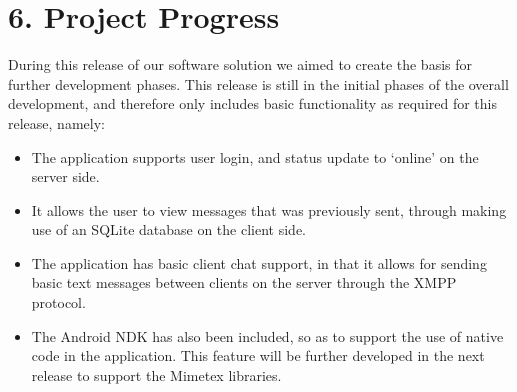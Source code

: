 \documentclass[29pt,a4paper]{moderncv}
\begin{document}
\newpage
		\section*{6. Project Progress}
		During this release of our software solution we aimed to create the basis for further development phases.  This release is still in the initial phases of the overall development, and therefore only includes basic functionality as required for this release, namely:
		
		\begin{itemize}
			\item The application supports user login, and status update to ‘online’ on the server side.
			\item It allows the user to view messages that was previously sent, through making use of an SQLite database on the client side.
			\item The application has basic client chat support, in that it allows for sending basic text messages between clients on the server through the XMPP protocol.
			\item The Android NDK has also been included, so as to support the use of native code in the application.  This feature will be further developed in the next release to support the Mimetex libraries.	\\
		\end{itemize} \\
		
\end{document}

